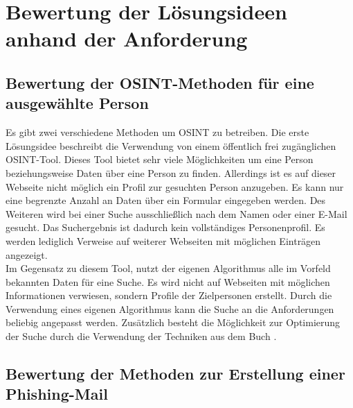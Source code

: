 

\chapter{Bewertung der Lösungsideen anhand der Anforderung}  %
\label{cha:BewertungLösungsideenAnhandAnforderung} %

\section{Bewertung der OSINT-Methoden für eine ausgewählte Person}
Es gibt zwei verschiedene Methoden um OSINT zu betreiben. Die erste Lösungsidee beschreibt die Verwendung von einem öffentlich frei zugänglichen OSINT-Tool. Dieses Tool bietet sehr viele Möglichkeiten um eine Person beziehungsweise Daten über eine Person zu finden. Allerdings ist es auf dieser Webseite nicht möglich ein Profil zur gesuchten Person anzugeben. Es kann nur eine begrenzte Anzahl an Daten über ein Formular eingegeben werden. Des Weiteren wird bei einer Suche ausschließlich nach dem Namen oder einer E-Mail gesucht. Das Suchergebnis ist dadurch kein vollständiges Personenprofil. Es werden lediglich Verweise auf weiterer Webseiten mit möglichen Einträgen angezeigt.\\
Im Gegensatz zu diesem Tool, nutzt der eigenen Algorithmus alle im Vorfeld bekannten Daten für eine Suche. Es wird nicht auf Webseiten mit möglichen Informationen verwiesen, sondern Profile der Zielpersonen erstellt. Durch die Verwendung eines eigenen Algorithmus kann die Suche an die Anforderungen beliebig angepasst werden. Zusätzlich besteht die Möglichkeit zur Optimierung der Suche durch die Verwendung der Techniken aus dem Buch \cite{Bazzell}.
\section{Bewertung der Methoden zur Erstellung einer Phishing-Mail}
